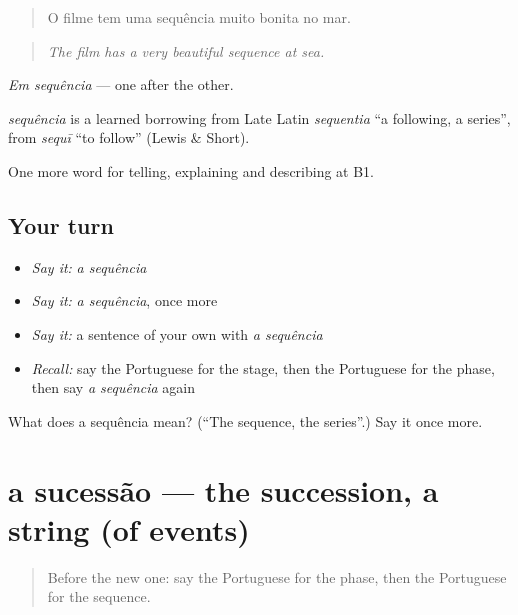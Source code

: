 \begin{quote}
O filme tem uma sequência muito bonita no mar.
\end{quote}

\begin{quote}
\emph{The film has a very beautiful sequence at sea.}
\end{quote}

\emph{Em sequência} — one after the other.

\begin{cousinweb}
\emph{sequência} is a learned borrowing from Late Latin \emph{sequentia} \textquotedblleft{}a following, a series\textquotedblright{}, from \emph{sequī} \textquotedblleft{}to follow\textquotedblright{} (Lewis \& Short).
\end{cousinweb}

\begin{grammarlens}[title={What you've built}]
One more word for telling, explaining and describing at B1.
\end{grammarlens}

\subsection*{Your turn}
\begin{itemize}
\raggedright
  \item \emph{Say it:} \emph{a sequência}
  \item \emph{Say it:} \emph{a sequência}, once more
  \item \emph{Say it:} a sentence of your own with \emph{a sequência}
  \item \emph{Recall:} say the Portuguese for the stage, then the Portuguese for the phase, then say \emph{a sequência} again
\end{itemize}

\begin{tcolorbox}[breakable,colback=teal!4,colframe=teal!35!black,title={Before you move on}]
What does a sequência mean? (\textquotedblleft{}The sequence, the series\textquotedblright{}.) Say it once more.
\end{tcolorbox}
\section[a sucessão]{a sucessão — the succession, a string (of events)}

\label{lesson:PT-C273-sucessao}



\begin{quote}
Before the new one: say the Portuguese for the phase, then the Portuguese for the sequence.
\end{quote}


